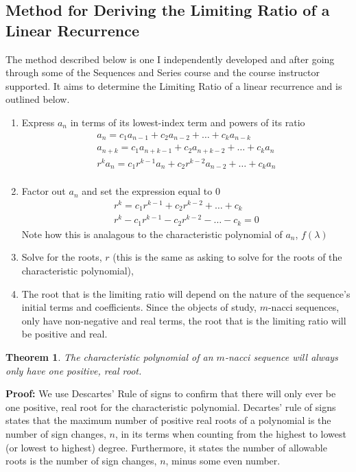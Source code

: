 \documentclass[11pt]{article}
\newtheorem{theorem}{Theorem}[section]
\begin{document}
\subsection{Method for Deriving the Limiting Ratio of a Linear Recurrence}
The method described below is one I independently developed and after going through some of the Sequences and Series course and the course instructor supported. It aims to determine the Limiting Ratio of a linear recurrence and is outlined below.
\begin{enumerate}
    \item Express $a_n$ in terms of its lowest-index term and powers of its ratio 
    \begin{align*}
        a_n=c_1a_{n-1}+c_2a_{n-2}+\dots +c_ka_{n-k} \\
        a_{n+k}=c_1a_{n+k-1}+c_2a_{n+k-2}+\dots +c_ka_{n} \\
        r^{k}a_{n}=c_1r^{k-1}a_{n}+c_2r^{k-2}a_{n-2}+\dots +c_ka_{n} \\
    \end{align*}
    \item Factor out $a_n$ and set the expression equal to 0
    \begin{align*}
        r^{k}=c_1r^{k-1}+c_2r^{k-2}+\dots +c_k \\
        r^{k}-c_1r^{k-1}-c_2r^{k-2}-\dots -c_k=0
    \end{align*}
    Note how this is analagous to the characteristic polynomial of $a_n$, \(f(\lambda)\)
    \item Solve for the roots, $r$ (this is the same as asking to solve for the roots of the characteristic polynomial), 
    \item The root that is the limiting ratio will depend on the nature of the sequence's initial terms and coefficients. Since the objects of study, \(m\)-nacci sequences, only have non-negative and real terms, the root that is the limiting ratio will be positive and real. 
\end{enumerate}
\begin{theorem}
    The characteristic polynomial of an \(m\)-nacci sequence will always only have one positive, real root.
\end{theorem}
\textbf{Proof:} We use Descartes' Rule of signs to confirm that there will only ever be one positive, real root for the characteristic polynomial. Decartes' rule of signs states that the maximum number of positive real roots of a polynomial is the number of sign changes, \(n\), in its terms when counting from the highest to lowest (or lowest to highest) degree. Furthermore, it states the number of allowable roots is the number of sign changes, \(n\), minus some even number. 
\end{document}
